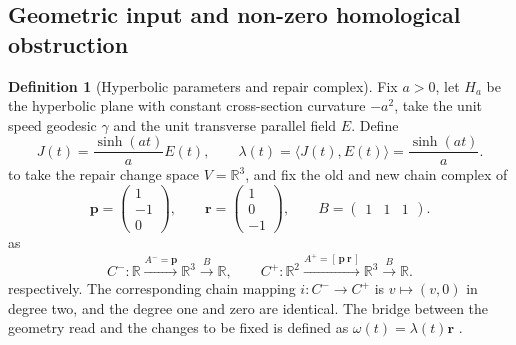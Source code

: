 \documentclass[12pt,a4paper,openany,notitlepage]{report}
\theoremstyle{plain}
\theoremstyle{definition}
\newtheorem{definition}[theorem]{Definition}
\theoremstyle{remark}
\begin{document}
\begin{CJK*}
\section { Geometric input and non-zero homological obstruction }

\begin{definition}
[Hyperbolic parameters and repair complex]\label{hgov:def:joint}
Fix $a>0$, let $H_a$ be the hyperbolic plane with constant cross-section curvature $-a^2$, take the unit speed geodesic $\gamma$ and the unit transverse parallel field $E$. Define \[
J(t)=\frac{\sinh(at)}aE(t),\qquad
\lambda(t)=\langle J(t),E(t)\rangle=\frac{\sinh(at)}a .
\] to take the repair change space $V=\mathbb R^3$, and fix the old and new chain complex of \[
\mathbf p=\begin{pmatrix}1\\-1\\0\end{pmatrix},\qquad
\mathbf r=\begin{pmatrix}1\\0\\-1\end{pmatrix},\qquad
B=\begin{pmatrix}1&1&1\end{pmatrix}.
\] as \[
C^-:\mathbb R\xrightarrow{A^-=\mathbf p}\mathbb R^3
\xrightarrow{B}\mathbb R,\qquad
C^+:\mathbb R^2\xrightarrow{A^+=[\,\mathbf p\ \mathbf r\,]}\mathbb R^3
\xrightarrow{B}\mathbb R.
\] respectively. The corresponding chain mapping $i:C^-\to C^+$ is $v\mapsto(v,0)$ in degree two, and the degree one and zero are identical. The bridge between the geometry read and the changes to be fixed is defined as $\omega(t)=\lambda(t)\mathbf r$ .\end{definition}



\end{CJK*}
\end{document}
